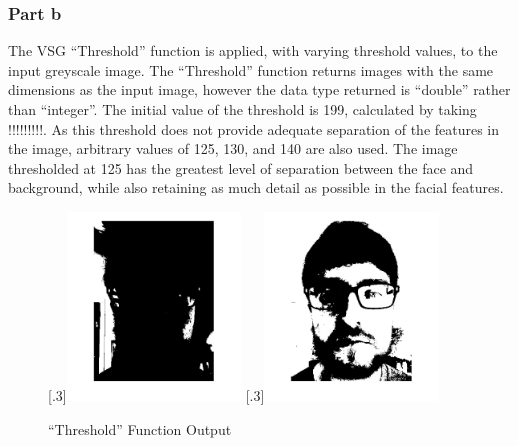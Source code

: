 \documentclass[a4paper]{article}
\begin{document}
	\subsubsection{Part b}
	The VSG ``Threshold'' function is applied, with varying threshold
	values, to the input greyscale image. The ``Threshold'' function returns
	images with the same dimensions as the input image, however the data
	type returned is ``double'' rather than ``integer''. The initial value of the
	threshold is 199, calculated by taking !!!!!!!!!. As this threshold does not
	provide adequate separation of the features in the image, arbitrary
	values of 125, 130, and 140 are also used. The image thresholded at 125
	has the greatest level of separation between the face and background,
	while also retaining as much detail as possible in the facial features.
	\begin{figure}[H]
		\centering
		[.3\linewidth]{\includegraphics[height=5cm]{Results/Q1/b/qbThreshData.jpg}}%
		[.3\linewidth]{\includegraphics[height=5cm]{Results/Q1/b/qbThresh125.jpg}}%
		\caption{``Threshold'' Function Output}
		\label{fig:}
	\end{figure}
\end{document}
